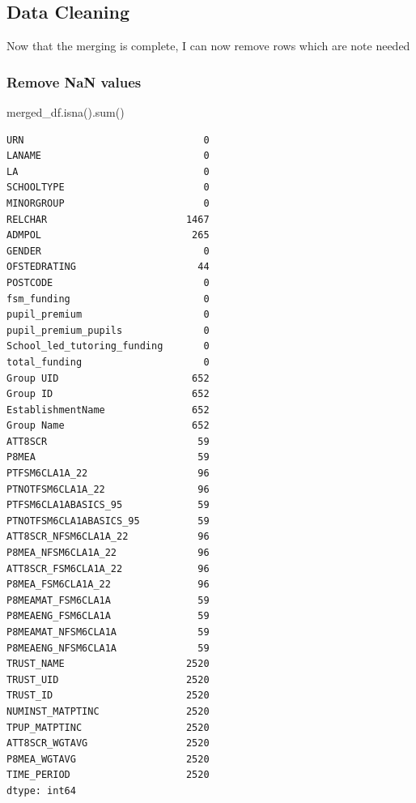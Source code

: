 \documentclass[
  letterpaper,
  DIV=11,
  numbers=noendperiod]{scrartcl}
\newenvironment{Shaded}{\begin{snugshade}}{\end{snugshade}}
\newcommand{\BuiltInTok}[1]{\textcolor[rgb]{0.00,0.23,0.31}{#1}}
\newcommand{\NormalTok}[1]{\textcolor[rgb]{0.00,0.23,0.31}{#1}}
\begin{document}
\subsection{Data Cleaning}\label{data-cleaning}

Now that the merging is complete, I can now remove rows which are note
needed

\subsubsection{Remove NaN values}\label{remove-nan-values}

\begin{Shaded}
\begin{Highlighting}[]
\NormalTok{merged\_df.isna().}\BuiltInTok{sum}\NormalTok{()}
\end{Highlighting}
\end{Shaded}

\begin{verbatim}
URN                               0
LANAME                            0
LA                                0
SCHOOLTYPE                        0
MINORGROUP                        0
RELCHAR                        1467
ADMPOL                          265
GENDER                            0
OFSTEDRATING                     44
POSTCODE                          0
fsm_funding                       0
pupil_premium                     0
pupil_premium_pupils              0
School_led_tutoring_funding       0
total_funding                     0
Group UID                       652
Group ID                        652
EstablishmentName               652
Group Name                      652
ATT8SCR                          59
P8MEA                            59
PTFSM6CLA1A_22                   96
PTNOTFSM6CLA1A_22                96
PTFSM6CLA1ABASICS_95             59
PTNOTFSM6CLA1ABASICS_95          59
ATT8SCR_NFSM6CLA1A_22            96
P8MEA_NFSM6CLA1A_22              96
ATT8SCR_FSM6CLA1A_22             96
P8MEA_FSM6CLA1A_22               96
P8MEAMAT_FSM6CLA1A               59
P8MEAENG_FSM6CLA1A               59
P8MEAMAT_NFSM6CLA1A              59
P8MEAENG_NFSM6CLA1A              59
TRUST_NAME                     2520
TRUST_UID                      2520
TRUST_ID                       2520
NUMINST_MATPTINC               2520
TPUP_MATPTINC                  2520
ATT8SCR_WGTAVG                 2520
P8MEA_WGTAVG                   2520
TIME_PERIOD                    2520
dtype: int64
\end{verbatim}
\end{document}
